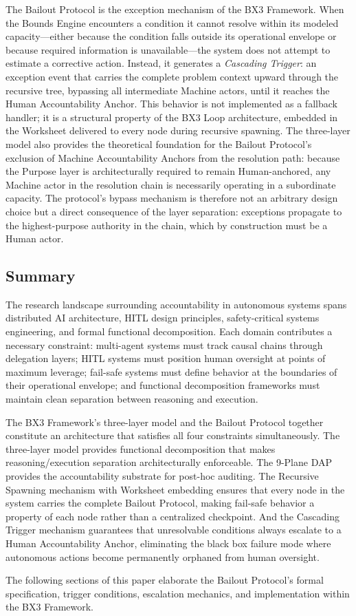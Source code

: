 \documentclass[12pt]{article}
\begin{document}
The Bailout Protocol is the exception mechanism of the BX3 Framework. When the Bounds Engine encounters a condition it cannot resolve within its modeled capacity—either because the condition falls outside its operational envelope or because required information is unavailable—the system does not attempt to estimate a corrective action. Instead, it generates a \textit{Cascading Trigger}: an exception event that carries the complete problem context upward through the recursive tree, bypassing all intermediate Machine actors, until it reaches the Human Accountability Anchor. This behavior is not implemented as a fallback handler; it is a structural property of the BX3 Loop architecture, embedded in the Worksheet delivered to every node during recursive spawning. The three-layer model also provides the theoretical foundation for the Bailout Protocol's exclusion of Machine Accountability Anchors from the resolution path: because the Purpose layer is architecturally required to remain Human-anchored, any Machine actor in the resolution chain is necessarily operating in a subordinate capacity. The protocol's bypass mechanism is therefore not an arbitrary design choice but a direct consequence of the layer separation: exceptions propagate to the highest-purpose authority in the chain, which by construction must be a Human actor.

\subsection{Summary}

The research landscape surrounding accountability in autonomous systems spans distributed AI architecture, HITL design principles, safety-critical systems engineering, and formal functional decomposition. Each domain contributes a necessary constraint: multi-agent systems must track causal chains through delegation layers; HITL systems must position human oversight at points of maximum leverage; fail-safe systems must define behavior at the boundaries of their operational envelope; and functional decomposition frameworks must maintain clean separation between reasoning and execution.

The BX3 Framework's three-layer model and the Bailout Protocol together constitute an architecture that satisfies all four constraints simultaneously. The three-layer model provides functional decomposition that makes reasoning/execution separation architecturally enforceable. The 9-Plane DAP provides the accountability substrate for post-hoc auditing. The Recursive Spawning mechanism with Worksheet embedding ensures that every node in the system carries the complete Bailout Protocol, making fail-safe behavior a property of each node rather than a centralized checkpoint. And the Cascading Trigger mechanism guarantees that unresolvable conditions always escalate to a Human Accountability Anchor, eliminating the black box failure mode where autonomous actions become permanently orphaned from human oversight.

The following sections of this paper elaborate the Bailout Protocol's formal specification, trigger conditions, escalation mechanics, and implementation within the BX3 Framework.
\end{document}
